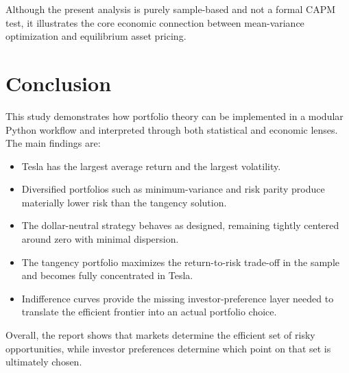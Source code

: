 \documentclass[wcp]{jmlr}
\begin{document}
Although the present analysis is purely sample-based and not a formal CAPM test, it illustrates the core economic connection between mean-variance optimization and equilibrium asset pricing.

\section{Conclusion}

This study demonstrates how portfolio theory can be implemented in a modular Python workflow and interpreted through both statistical and economic lenses. The main findings are:
\begin{itemize}
\item Tesla has the largest average return and the largest volatility.
\item Diversified portfolios such as minimum-variance and risk parity produce materially lower risk than the tangency solution.
\item The dollar-neutral strategy behaves as designed, remaining tightly centered around zero with minimal dispersion.
\item The tangency portfolio maximizes the return-to-risk trade-off in the sample and becomes fully concentrated in Tesla.
\item Indifference curves provide the missing investor-preference layer needed to translate the efficient frontier into an actual portfolio choice.
\end{itemize}

Overall, the report shows that markets determine the efficient set of risky opportunities, while investor preferences determine which point on that set is ultimately chosen.
\end{document}
